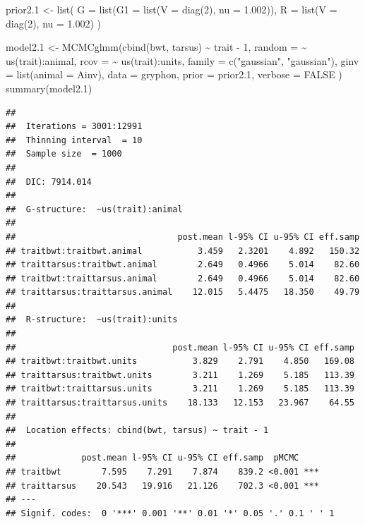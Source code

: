 \documentclass[
  12pt,
]{book}
\newenvironment{Shaded}{\begin{snugshade}}{\end{snugshade}}
\newcommand{\AttributeTok}[1]{\textcolor[rgb]{0.77,0.63,0.00}{#1}}
\newcommand{\ConstantTok}[1]{\textcolor[rgb]{0.00,0.00,0.00}{#1}}
\newcommand{\DecValTok}[1]{\textcolor[rgb]{0.00,0.00,0.81}{#1}}
\newcommand{\FloatTok}[1]{\textcolor[rgb]{0.00,0.00,0.81}{#1}}
\newcommand{\FunctionTok}[1]{\textcolor[rgb]{0.00,0.00,0.00}{#1}}
\newcommand{\NormalTok}[1]{#1}
\newcommand{\OtherTok}[1]{\textcolor[rgb]{0.56,0.35,0.01}{#1}}
\newcommand{\SpecialCharTok}[1]{\textcolor[rgb]{0.00,0.00,0.00}{#1}}
\newcommand{\StringTok}[1]{\textcolor[rgb]{0.31,0.60,0.02}{#1}}
\begin{document}
\begin{Shaded}
\begin{Highlighting}[]
\NormalTok{prior2}\FloatTok{.1} \OtherTok{\textless{}{-}} \FunctionTok{list}\NormalTok{(}
  \AttributeTok{G =} \FunctionTok{list}\NormalTok{(}\AttributeTok{G1 =} \FunctionTok{list}\NormalTok{(}\AttributeTok{V =} \FunctionTok{diag}\NormalTok{(}\DecValTok{2}\NormalTok{), }\AttributeTok{nu =} \FloatTok{1.002}\NormalTok{)),}
  \AttributeTok{R =} \FunctionTok{list}\NormalTok{(}\AttributeTok{V =} \FunctionTok{diag}\NormalTok{(}\DecValTok{2}\NormalTok{), }\AttributeTok{nu =} \FloatTok{1.002}\NormalTok{)}
\NormalTok{)}

\NormalTok{model2}\FloatTok{.1} \OtherTok{\textless{}{-}} \FunctionTok{MCMCglmm}\NormalTok{(}\FunctionTok{cbind}\NormalTok{(bwt, tarsus) }\SpecialCharTok{\textasciitilde{}}\NormalTok{ trait }\SpecialCharTok{{-}} \DecValTok{1}\NormalTok{,}
  \AttributeTok{random =} \SpecialCharTok{\textasciitilde{}} \FunctionTok{us}\NormalTok{(trait)}\SpecialCharTok{:}\NormalTok{animal,}
  \AttributeTok{rcov =} \SpecialCharTok{\textasciitilde{}} \FunctionTok{us}\NormalTok{(trait)}\SpecialCharTok{:}\NormalTok{units,}
  \AttributeTok{family =} \FunctionTok{c}\NormalTok{(}\StringTok{"gaussian"}\NormalTok{, }\StringTok{"gaussian"}\NormalTok{),}
  \AttributeTok{ginv =} \FunctionTok{list}\NormalTok{(}\AttributeTok{animal =}\NormalTok{ Ainv),}
  \AttributeTok{data =}\NormalTok{ gryphon, }\AttributeTok{prior =}\NormalTok{ prior2}\FloatTok{.1}\NormalTok{, }\AttributeTok{verbose =} \ConstantTok{FALSE}
\NormalTok{)}
\FunctionTok{summary}\NormalTok{(model2}\FloatTok{.1}\NormalTok{)}
\end{Highlighting}
\end{Shaded}

\begin{verbatim}
## 
##  Iterations = 3001:12991
##  Thinning interval  = 10
##  Sample size  = 1000 
## 
##  DIC: 7914.014 
## 
##  G-structure:  ~us(trait):animal
## 
##                                post.mean l-95% CI u-95% CI eff.samp
## traitbwt:traitbwt.animal           3.459   2.3201    4.892   150.32
## traittarsus:traitbwt.animal        2.649   0.4966    5.014    82.60
## traitbwt:traittarsus.animal        2.649   0.4966    5.014    82.60
## traittarsus:traittarsus.animal    12.015   5.4475   18.350    49.79
## 
##  R-structure:  ~us(trait):units
## 
##                               post.mean l-95% CI u-95% CI eff.samp
## traitbwt:traitbwt.units           3.829    2.791    4.850   169.08
## traittarsus:traitbwt.units        3.211    1.269    5.185   113.39
## traitbwt:traittarsus.units        3.211    1.269    5.185   113.39
## traittarsus:traittarsus.units    18.133   12.153   23.967    64.55
## 
##  Location effects: cbind(bwt, tarsus) ~ trait - 1 
## 
##             post.mean l-95% CI u-95% CI eff.samp  pMCMC    
## traitbwt        7.595    7.291    7.874    839.2 <0.001 ***
## traittarsus    20.543   19.916   21.126    702.3 <0.001 ***
## ---
## Signif. codes:  0 '***' 0.001 '**' 0.01 '*' 0.05 '.' 0.1 ' ' 1
\end{verbatim}
\end{document}
